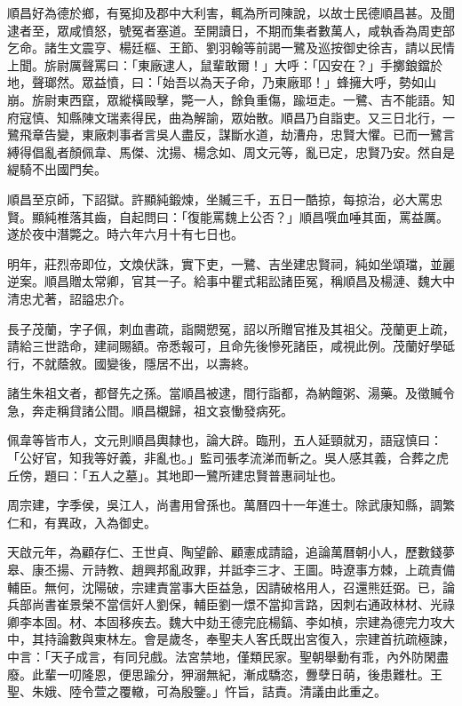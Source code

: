 \begin{pinyinscope}
順昌好為德於鄉，有冤抑及郡中大利害，輒為所司陳說，以故士民德順昌甚。及聞逮者至，眾咸憤怒，號冤者塞道。至開讀日，不期而集者數萬人，咸執香為周吏部乞命。諸生文震亨、楊廷樞、王節、劉羽翰等前謁一鷺及巡按御史徐吉，請以民情上聞。旂尉厲聲罵曰：「東廠逮人，鼠輩敢爾！」大呼：「囚安在？」手擲鋃鐺於地，聲瑯然。眾益憤，曰：「始吾以為天子命，乃東廠耶！」蜂擁大呼，勢如山崩。旂尉東西竄，眾縱橫毆擊，斃一人，餘負重傷，踰垣走。一鷺、吉不能語。知府寇慎、知縣陳文瑞素得民，曲為解諭，眾始散。順昌乃自詣吏。又三日北行，一鷺飛章告變，東廠刺事者言吳人盡反，謀斷水道，劫漕舟，忠賢大懼。已而一鷺言縛得倡亂者顏佩韋、馬傑、沈揚、楊念如、周文元等，亂已定，忠賢乃安。然自是緹騎不出國門矣。

順昌至京師，下詔獄。許顯純鍛煉，坐贓三千，五日一酷掠，每掠治，必大罵忠賢。顯純椎落其齒，自起問曰：「復能罵魏上公否？」順昌噀血唾其面，罵益厲。遂於夜中潛斃之。時六年六月十有七日也。

明年，莊烈帝即位，文煥伏誅，實下吏，一鷺、吉坐建忠賢祠，純如坐頌璫，並麗逆案。順昌贈太常卿，官其一子。給事中瞿式耜訟諸臣冤，稱順昌及楊漣、魏大中清忠尤著，詔謚忠介。

長子茂蘭，字子佩，刺血書疏，詣闕愬冤，詔以所贈官推及其祖父。茂蘭更上疏，請給三世誥命，建祠賜額。帝悉報可，且命先後慘死諸臣，咸視此例。茂蘭好學砥行，不就蔭敘。國變後，隱居不出，以壽終。

諸生朱祖文者，都督先之孫。當順昌被逮，間行詣都，為納饘粥、湯藥。及徵贓令急，奔走稱貸諸公間。順昌櫬歸，祖文哀慟發病死。

佩韋等皆市人，文元則順昌輿隸也，論大辟。臨刑，五人延頸就刃，語寇慎曰：「公好官，知我等好義，非亂也。」監司張孝流涕而斬之。吳人感其義，合葬之虎丘傍，題曰：「五人之墓」。其地即一鷺所建忠賢普惠祠址也。

周宗建，字季侯，吳江人，尚書用曾孫也。萬曆四十一年進士。除武康知縣，調繁仁和，有異政，入為御史。

天啟元年，為顧存仁、王世貞、陶望齡、顧憲成請謚，追論萬曆朝小人，歷數錢夢皋、康丕揚、亓詩教、趙興邦亂政罪，并詆李三才、王圖。時遼事方棘，上疏責備輔臣。無何，沈陽破，宗建責當事大臣益急，因請破格用人，召還熊廷弼。已，論兵部尚書崔景榮不當信奸人劉保，輔臣劉一燝不當抑言路，因刺右通政林材、光祿卿李本固。材、本固移疾去。魏大中劾王德完庇楊鎬、李如楨，宗建為德完力攻大中，其持論數與東林左。會是歲冬，奉聖夫人客氏既出宮復入，宗建首抗疏極諫，中言：「天子成言，有同兒戲。法宮禁地，僅類民家。聖朝舉動有乖，內外防閑盡廢。此輩一叨隆恩，便思踰分，狎溺無紀，漸成驕恣，釁孽日萌，後患難杜。王聖、朱娥、陸令萱之覆轍，可為殷鑒。」忤旨，詰責。清議由此重之。


\end{pinyinscope}
